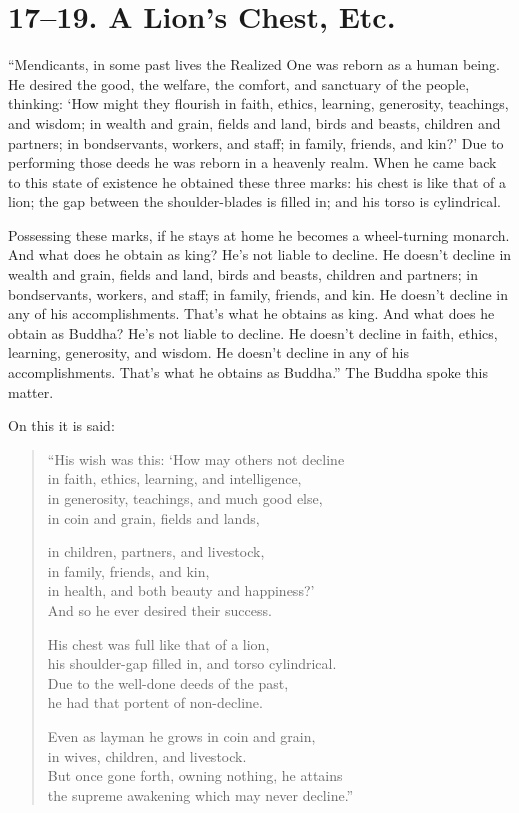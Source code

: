 \documentclass[12pt,openany]{book}%
\begin{document}
\section*{17–19. A Lion’s Chest, Etc. }

“Mendicants, in some past lives the Realized One was reborn as a human being. He desired the good, the welfare, the comfort, and sanctuary of the people, thinking: ‘How might they flourish in faith, ethics, learning, generosity, teachings, and wisdom; in wealth and grain, fields and land, birds and beasts, children and partners; in bondservants, workers, and staff; in family, friends, and kin?’ Due to performing those deeds he was reborn in a heavenly realm. When he came back to this state of existence he obtained these three marks: his chest is like that of a lion; the gap between the shoulder-blades is filled in; and his torso is cylindrical. 

Possessing these marks, if he stays at home he becomes a wheel-turning monarch. And what does he obtain as king? He’s not liable to decline. He doesn’t decline in wealth and grain, fields and land, birds and beasts, children and partners; in bondservants, workers, and staff; in family, friends, and kin. He doesn’t decline in any of his accomplishments. That’s what he obtains as king. And what does he obtain as Buddha? He’s not liable to decline. He doesn’t decline in faith, ethics, learning, generosity, and wisdom. He doesn’t decline in any of his accomplishments. That’s what he obtains as Buddha.” The Buddha spoke this matter. 

On this it is said: 

\begin{verse}%
“His wish was this: ‘How may others not decline \\
in faith, ethics, learning, and intelligence, \\
in generosity, teachings, and much good else, \\
in coin and grain, fields and lands, 

in children, partners, and livestock, \\
in family, friends, and kin, \\
in health, and both beauty and happiness?’ \\
And so he ever desired their success. 

His chest was full like that of a lion, \\
his shoulder-gap filled in, and torso cylindrical. \\
Due to the well-done deeds of the past, \\
he had that portent of non-decline. 

Even as layman he grows in coin and grain, \\
in wives, children, and livestock. \\
But once gone forth, owning nothing, he attains \\
the supreme awakening which may never decline.” 

%
\end{verse}
\end{document}
